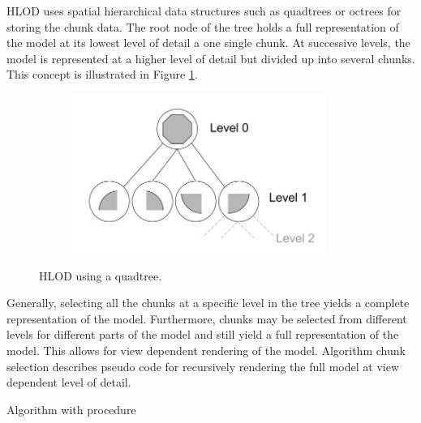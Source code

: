 HLOD uses spatial hierarchical data structures such as quadtrees or octrees for storing the chunk data. The root node of the tree holds a full representation of the model at its lowest level of detail a one single chunk. At successive levels, the model is represented at a higher level of detail but divided up into several chunks. This concept is illustrated in Figure \ref{fig:hlod}.

\begin{figure}[htbp]
    \centering
    \begin{subfigure}[bt]{0.4\textwidth}
        \includegraphics[width=\textwidth]{figures/lod/hlod_tmp.png}
    \end{subfigure}
    \caption{HLOD using a quadtree.}
    \label{fig:hlod}
\end{figure}

Generally, selecting all the chunks at a specific level in the tree yields a complete representation of the model. Furthermore, chunks may be selected from different levels for different parts of the model and still yield a full representation of the model. This allows for view dependent rendering of the model. Algorithm chunk selection describes pseudo code for recursively rendering the full model at view dependent level of detail.

\begin{algorithm}[htp]
  \caption{Algorithm with procedure}
\end{algorithm} 

